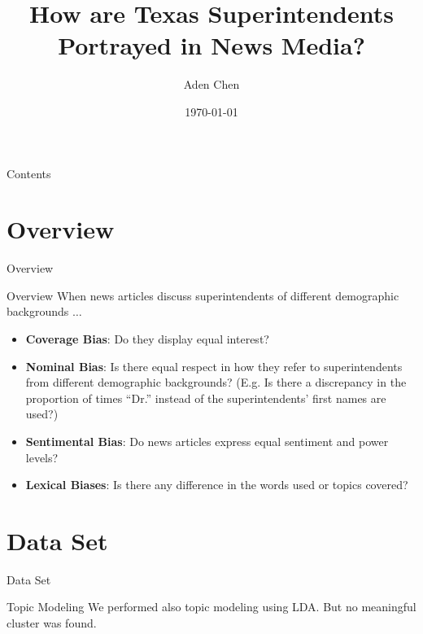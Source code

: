 \documentclass[notes, 10pt, aspectratio=169]{beamer}
\title{How are Texas Superintendents Portrayed in News Media?}
\author{Aden Chen}
\institute{University of Chicago}
\date{\today}
\begin{document}
\begin{frame}
  \titlepage
\end{frame}


\begin{frame}[t]{Contents}
  \begin{multicols}{2}
  \tableofcontents
  \end{multicols}
\end{frame}


\section{Overview}

\begin{transitionframe}
  \begin{center}
    {\Huge Overview}
  \end{center}
\end{transitionframe}
 

\begin{frame}{Overview}
  When news articles discuss superintendents of different demographic backgrounds \(\dots \)
  \begin{itemize}
    \item \textbf{Coverage Bias}: Do they display equal interest? 
    \item \textbf{Nominal Bias}: Is there equal respect in how they refer to superintendents from different demographic backgrounds? (E.g. Is there a discrepancy in the proportion of times ``Dr.'' instead of the superintendents' first names are used?)
    \item \textbf{Sentimental Bias}: Do news articles express equal sentiment and power levels?
    \item \textbf{Lexical Biases}: Is there any difference in the words used or topics covered?
  \end{itemize}
\end{frame}


\section{Data Set}

\begin{transitionframe}
  \begin{center}
    {\Huge Data Set}
  \end{center}
\end{transitionframe}




\begin{frame}{Topic Modeling}
  We performed also topic modeling using LDA. But no meaningful cluster was found. 
\end{frame}
\end{document}

